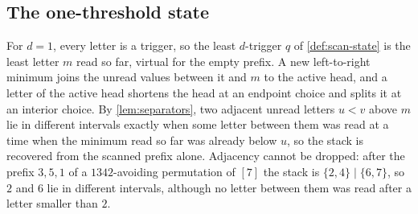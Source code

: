 \documentclass[11pt,reqno]{amsart}
\theoremstyle{definition}
\theoremstyle{remark}
\begin{document}
\subsection{The one-threshold state}

For $d=1$, every letter is a trigger, so the least $d$-trigger $q$ of
\cref{def:scan-state} is the least letter $m$ read so far, virtual for the
empty prefix.  A new left-to-right minimum joins the unread values between
it and $m$ to the active head, and a letter of the active head shortens the
head at an endpoint choice and splits it at an interior choice.  By
\cref{lem:separators}, two adjacent unread letters $u<v$ above $m$ lie in
different intervals exactly when some letter between them was read at a time
when the minimum read so far was already below $u$, so the stack is
recovered from the scanned prefix alone.  Adjacency cannot be dropped:
after the prefix $3,5,1$ of a $1342$-avoiding permutation of $[7]$ the
stack is $\{2,4\}\mid\{6,7\}$, so $2$ and $6$ lie in different intervals,
although no letter between them was read after a letter smaller than $2$.
\end{document}

